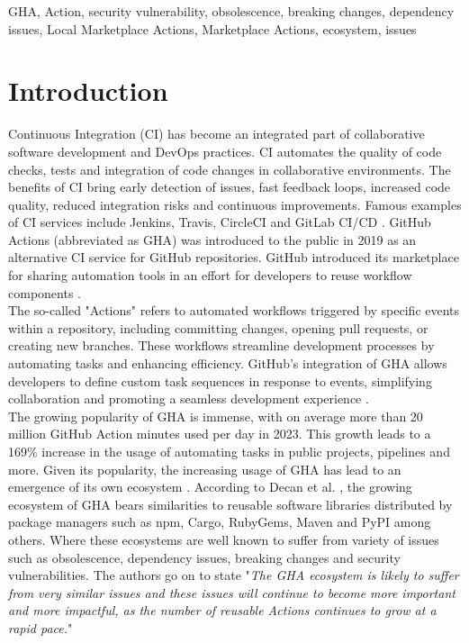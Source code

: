 \documentclass[conference]{IEEEtran}
\begin{document}
\begin{IEEEkeywords}
GHA, Action, security vulnerability, obsolescence, breaking changes, dependency issues, Local Marketplace Actions, Marketplace Actions, ecosystem, issues
\end{IEEEkeywords}

\section{Introduction}
    Continuous Integration (CI) has become an integrated part of collaborative software development and DevOps practices. CI automates the quality of code checks, tests and integration of code changes in collaborative environments. The benefits of CI bring early detection of issues, fast feedback loops, increased code quality, reduced integration risks and continuous improvements. Famous examples of CI services include Jenkins, Travis, CircleCI and GitLab CI/CD \cite{dabbish2012social}. GitHub Actions (abbreviated as GHA) was introduced to the public in 2019 as an alternative CI service for GitHub repositories. GitHub introduced its marketplace for sharing automation tools in an effort for developers to reuse workflow components \cite{saroar2023developers}. \\ 
    The so-called "Actions" refers to automated workflows triggered by specific events within a repository, including committing changes, opening pull requests, or creating new branches. These workflows streamline development processes by automating tasks and enhancing efficiency. GitHub's integration of GHA allows developers to define custom task sequences in response to events, simplifying collaboration and promoting a seamless development experience \cite{chandrasekara2021getting}. \\
    The growing popularity of GHA is immense, with on average more than 20 million GitHub Action minutes used per day in 2023. This growth leads to a 169\% increase in the usage of automating tasks in public projects,  pipelines and more\cite{github2023octoverse}. Given its popularity,  the increasing usage of GHA has lead to an emergence of its own ecosystem \cite{decan2022use}.  According to Decan et al. \cite{decan2022use}, the growing ecosystem of GHA bears similarities to reusable software libraries distributed by package managers such as npm, Cargo, RubyGems, Maven and PyPI among others. Where these ecosystems are well known to suffer from variety of issues such as obsolescence, dependency issues, breaking changes and security vulnerabilities\cite{decan2022use}. The authors go on to state "\textit{The GHA ecosystem is likely to suffer from very similar issues and these issues will continue to become more important and more impactful, as the number of reusable Actions continues to grow at a rapid pace.}"\\
\end{document}

